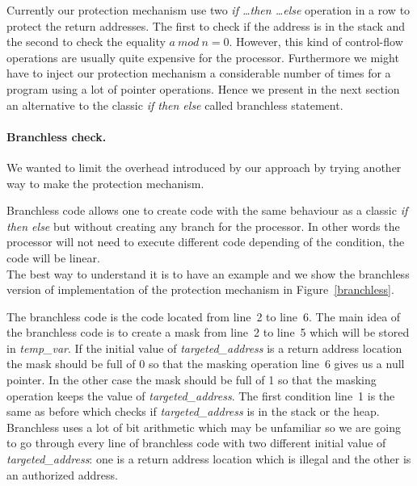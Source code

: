 \documentclass[11pt]{sdm}
\begin{document}
Currently our protection mechanism use two \textit{if \dots then \dots else} operation in a row to protect the return addresses. The first to check if the address is in the stack and the second to check the equality $a~mod~n=0$.
However, this kind of control-flow operations are usually quite expensive for the processor. Furthermore we might have to inject our protection mechanism a considerable number of times for a program using a lot of pointer operations.
Hence we present in the next section an alternative to the classic \textit{if then else} called branchless statement.

\paragraph{Branchless check.}
\label{par:Branchless check}

We wanted to limit the overhead introduced by our approach by trying another way to make the protection mechanism. 

Branchless code allows one to create code with the same behaviour as a classic \textit{if then else} but without creating any branch for the processor. In other words the processor will not need to execute different code depending of the condition, the code will be linear.\\
The best way to understand it is to have an example and we show the branchless version of implementation of the protection mechanism in Figure~\ref{branchless}.

The branchless code is the code located from line~2 to line~6.
The main idea of the branchless code is to create a mask from line~2 to line~5 which will be stored in \textit{temp\_var}. If the initial value of \textit{targeted\_address} is a return address location the mask should be full of 0 so that the masking operation line~6 gives us a null pointer. In the other case the mask should be full of 1 so that the masking operation keeps the value of \textit{targeted\_address}.
The first condition line~1 is the same as before which checks if \textit{targeted\_address} is in the stack or the heap.
Branchless uses a lot of bit arithmetic which may be unfamiliar so we are going to go through every line of branchless code with two different initial value of \textit{targeted\_address}: one is a return address location which is illegal and the other is an authorized address.
\end{document}
